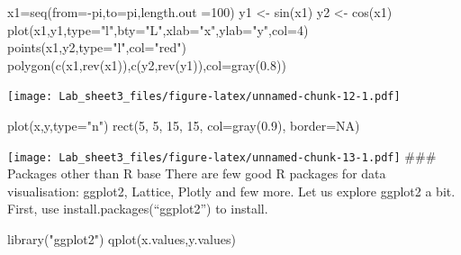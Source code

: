 \documentclass[
]{article}
\newenvironment{Shaded}{\begin{snugshade}}{\end{snugshade}}
\newcommand{\AttributeTok}[1]{\textcolor[rgb]{0.77,0.63,0.00}{#1}}
\newcommand{\ConstantTok}[1]{\textcolor[rgb]{0.00,0.00,0.00}{#1}}
\newcommand{\DecValTok}[1]{\textcolor[rgb]{0.00,0.00,0.81}{#1}}
\newcommand{\FloatTok}[1]{\textcolor[rgb]{0.00,0.00,0.81}{#1}}
\newcommand{\FunctionTok}[1]{\textcolor[rgb]{0.00,0.00,0.00}{#1}}
\newcommand{\NormalTok}[1]{#1}
\newcommand{\OtherTok}[1]{\textcolor[rgb]{0.56,0.35,0.01}{#1}}
\newcommand{\SpecialCharTok}[1]{\textcolor[rgb]{0.00,0.00,0.00}{#1}}
\newcommand{\StringTok}[1]{\textcolor[rgb]{0.31,0.60,0.02}{#1}}
\theoremstyle{remark}
\begin{document}
\begin{Shaded}
\begin{Highlighting}[]
\NormalTok{x1}\OtherTok{=}\FunctionTok{seq}\NormalTok{(}\AttributeTok{from=}\SpecialCharTok{{-}}\NormalTok{pi,}\AttributeTok{to=}\NormalTok{pi,}\AttributeTok{length.out =}\DecValTok{100}\NormalTok{)}
\NormalTok{y1 }\OtherTok{\textless{}{-}} \FunctionTok{sin}\NormalTok{(x1) }
\NormalTok{y2 }\OtherTok{\textless{}{-}} \FunctionTok{cos}\NormalTok{(x1)}
\FunctionTok{plot}\NormalTok{(x1,y1,}\AttributeTok{type=}\StringTok{"l"}\NormalTok{,}\AttributeTok{bty=}\StringTok{"L"}\NormalTok{,}\AttributeTok{xlab=}\StringTok{"x"}\NormalTok{,}\AttributeTok{ylab=}\StringTok{"y"}\NormalTok{,}\AttributeTok{col=}\DecValTok{4}\NormalTok{)}
\FunctionTok{points}\NormalTok{(x1,y2,}\AttributeTok{type=}\StringTok{"l"}\NormalTok{,}\AttributeTok{col=}\StringTok{"red"}\NormalTok{)}
\FunctionTok{polygon}\NormalTok{(}\FunctionTok{c}\NormalTok{(x1,}\FunctionTok{rev}\NormalTok{(x1)),}\FunctionTok{c}\NormalTok{(y2,}\FunctionTok{rev}\NormalTok{(y1)),}\AttributeTok{col=}\FunctionTok{gray}\NormalTok{(}\FloatTok{0.8}\NormalTok{))}
\end{Highlighting}
\end{Shaded}

\texttt{[image: Lab\_sheet3\_files/figure-latex/unnamed-chunk-12-1.pdf]}

\begin{Shaded}
\begin{Highlighting}[]
\FunctionTok{plot}\NormalTok{(x,y,}\AttributeTok{type=}\StringTok{"n"}\NormalTok{)}
\FunctionTok{rect}\NormalTok{(}\DecValTok{5}\NormalTok{, }\DecValTok{5}\NormalTok{, }\DecValTok{15}\NormalTok{, }\DecValTok{15}\NormalTok{, }\AttributeTok{col=}\FunctionTok{gray}\NormalTok{(}\FloatTok{0.9}\NormalTok{), }\AttributeTok{border=}\ConstantTok{NA}\NormalTok{)}
\end{Highlighting}
\end{Shaded}

\texttt{[image: Lab\_sheet3\_files/figure-latex/unnamed-chunk-13-1.pdf]}
\#\#\# Packages other than R base There are few good R packages for data
visualisation: ggplot2, Lattice, Plotly and few more. Let us explore
ggplot2 a bit. First, use install.packages(``ggplot2'') to install.

\begin{Shaded}
\begin{Highlighting}[]
\FunctionTok{library}\NormalTok{(}\StringTok{"ggplot2"}\NormalTok{)}
\FunctionTok{qplot}\NormalTok{(x.values,y.values)}
\end{Highlighting}
\end{Shaded}
\end{document}
